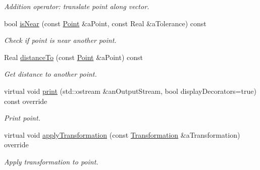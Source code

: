 \begin{DoxyCompactItemize}
\begin{DoxyCompactList}\small\item\em Addition operator\+: translate point along vector. \end{DoxyCompactList}\item 
bool \hyperlink{classlibrary_1_1math_1_1geom_1_1d3_1_1objects_1_1_point_a0bcdce172502509f9b9d4e5b3fc75a69}{is\+Near} (const \hyperlink{classlibrary_1_1math_1_1geom_1_1d3_1_1objects_1_1_point}{Point} \&a\+Point, const Real \&a\+Tolerance) const
\begin{DoxyCompactList}\small\item\em Check if point is near another point. \end{DoxyCompactList}\item 
Real \hyperlink{classlibrary_1_1math_1_1geom_1_1d3_1_1objects_1_1_point_a0108b685599f2684837d2898250c5a36}{distance\+To} (const \hyperlink{classlibrary_1_1math_1_1geom_1_1d3_1_1objects_1_1_point}{Point} \&a\+Point) const
\begin{DoxyCompactList}\small\item\em Get distance to another point. \end{DoxyCompactList}\item 
virtual void \hyperlink{classlibrary_1_1math_1_1geom_1_1d3_1_1objects_1_1_point_a76847422ebfcc28388d1b0427a5cb1de}{print} (std\+::ostream \&an\+Output\+Stream, bool display\+Decorators=true) const override
\begin{DoxyCompactList}\small\item\em Print point. \end{DoxyCompactList}\item 
virtual void \hyperlink{classlibrary_1_1math_1_1geom_1_1d3_1_1objects_1_1_point_ad2052f6ef5df88b75cae09c58a678f95}{apply\+Transformation} (const \hyperlink{classlibrary_1_1math_1_1geom_1_1d3_1_1_transformation}{Transformation} \&a\+Transformation) override
\begin{DoxyCompactList}\small\item\em Apply transformation to point. \end{DoxyCompactList}\end{DoxyCompactItemize}
